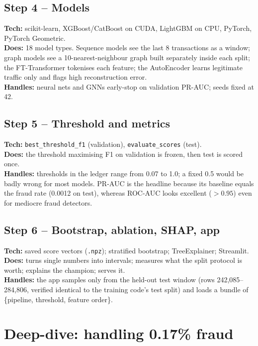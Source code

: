 \documentclass[11pt,a4paper]{article}
\begin{document}
\subsection{Step 4 -- Models}
\textbf{Tech:} scikit-learn, XGBoost/CatBoost on CUDA, LightGBM on CPU, PyTorch, PyTorch Geometric.\\
\textbf{Does:} 18 model types. Sequence models see the last 8 transactions as a window; graph models
see a 10-nearest-neighbour graph built separately inside each split; the FT-Transformer tokenises each
feature; the AutoEncoder learns legitimate traffic only and flags high reconstruction error.\\
\textbf{Handles:} neural nets and GNNs early-stop on validation PR-AUC; seeds fixed at 42.

\subsection{Step 5 -- Threshold and metrics}
\textbf{Tech:} \texttt{best\_threshold\_f1} (validation), \texttt{evaluate\_scores} (test).\\
\textbf{Does:} the threshold maximising F1 on validation is frozen, then test is scored once.\\
\textbf{Handles:} thresholds in the ledger range from 0.07 to 1.0; a fixed 0.5 would be badly wrong for
most models. PR-AUC is the headline because its baseline equals the fraud rate (0.0012 on test),
whereas ROC-AUC looks excellent ($>0.95$) even for mediocre fraud detectors.

\subsection{Step 6 -- Bootstrap, ablation, SHAP, app}
\textbf{Tech:} saved score vectors (\texttt{.npz}); stratified bootstrap; TreeExplainer; Streamlit.\\
\textbf{Does:} turns single numbers into intervals; measures what the split protocol is worth; explains
the champion; serves it.\\
\textbf{Handles:} the app samples only from the held-out test window (rows 242,085--284,806, verified
identical to the training code's test split) and loads a bundle of \{pipeline, threshold, feature order\}.

\section{Deep-dive: handling 0.17\% fraud}
\end{document}
